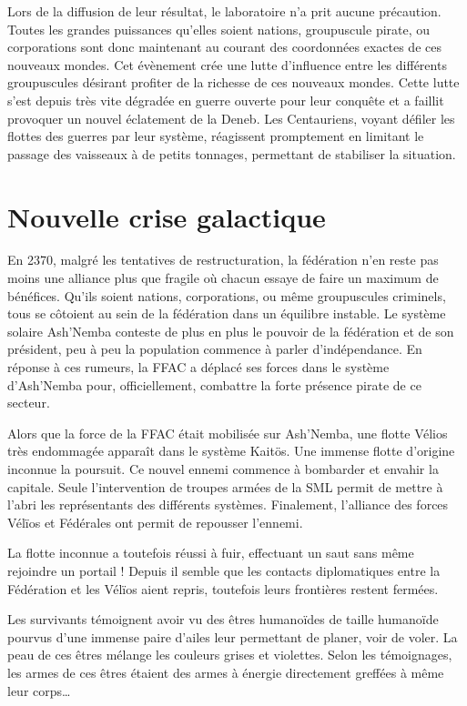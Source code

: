 \begin{multicols}{2}
Lors de la diffusion de leur résultat, le laboratoire n’a prit aucune précaution. Toutes les grandes puissances qu’elles soient nations, groupuscule pirate, ou corporations sont donc maintenant au courant des coordonnées exactes de ces nouveaux mondes. Cet évènement crée une lutte d’influence entre les différents groupuscules désirant profiter de la richesse de ces nouveaux mondes. Cette lutte s’est depuis très vite dégradée en guerre ouverte pour leur conquête et a faillit provoquer un nouvel éclatement de la Deneb. Les Centauriens, voyant défiler les flottes des guerres par leur système, réagissent promptement en limitant le passage des vaisseaux à de petits tonnages, permettant de stabiliser la situation.

\section{Nouvelle crise galactique}

En 2370, malgré les tentatives de restructuration, la fédération n’en reste pas moins une alliance plus que fragile où chacun essaye de faire un maximum de bénéfices. Qu’ils soient nations, corporations, ou même groupuscules criminels, tous se côtoient au sein de la fédération dans un équilibre instable. Le système solaire Ash’Nemba conteste de plus en plus le pouvoir de la fédération et de son président, peu à peu la population commence à parler d’indépendance. En réponse à ces rumeurs, la FFAC a déplacé ses forces dans le système d’Ash’Nemba pour, officiellement, combattre la forte présence pirate de ce secteur.

Alors que la force de la FFAC était mobilisée sur Ash’Nemba, une flotte Vélios très endommagée apparaît dans le système Kaitös. Une immense flotte d'origine inconnue la poursuit. Ce nouvel ennemi commence à bombarder et envahir la capitale.  Seule l'intervention de troupes armées de la SML permit de mettre à l’abri les représentants des différents systèmes. Finalement, l'alliance des forces Vélïos et Fédérales ont permit de repousser l'ennemi.

La flotte inconnue a toutefois réussi à fuir, effectuant un saut sans même rejoindre un portail ! Depuis il semble que les contacts diplomatiques entre la Fédération et les Vélïos aient repris, toutefois leurs frontières restent fermées. 

Les survivants témoignent avoir vu des êtres humanoïdes de taille humanoïde pourvus d’une immense paire d’ailes leur permettant de planer, voir de voler. La peau de ces êtres mélange les couleurs grises et violettes. Selon les témoignages, les armes de ces êtres étaient des armes à énergie directement greffées à même leur corps… 


\end{multicols}

